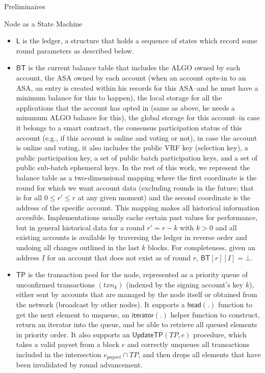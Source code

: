 \documentclass[10pt,a4paper]{article}
\begin{document}
\begin{section}{Preliminaires}
\begin{subsection}{Node as a State Machine}
\begin{itemize}
    \item
    $\mathsf{L}$ is the {\sf ledger}, a structure that holds a sequence of states which
    record some round parameters as described below.
    
    \item
    $\mathsf{BT}$ is the current balance table  that includes 
      the ALGO owned by each account, 
      the ASA owned by each account (when an account opts-in to an ASA, an entry is created within his records for
        this ASA--and he must have a minimum balance for this to happen),
      the local storage for all the applications that the account has opted in (same as above, he needs a minumum
        ALGO balance for this),
      the global storage for this account--in case it belongs to a smart contract,
      the consensus participation status of this account (e.g., if this account is online and voting or not),
      in case the account is online and voting, it also includes
        the public VRF key (selection key),
        a public participation key, 
        a set of public batch participation keys, 
        and a set of public sub-batch ephemeral keys.
        In the rest of this work, we represent the balance table as a two-dimensional mapping where the
        first coordinate is the round for which we want account data (excluding rounds in the future; that
        is for all $0 \leq r\prime \leq r$ at any given moment)
        and the second coordinate is the address of the specific account.
        This mapping makes all historical information accesible. Implementations usually cache certain past
        values for performance, but in general historical data for a round $r\prime = r-k$ with $k>0$ and all 
        existing accounts is available by traversing the ledger in reverse order and undoing all changes outlined 
        in the last $k$ blocks.
        For completeness, given an address $I$ for an account that does not exist as of round $r$,
        $\mathsf{BT}[r][I] = \bot$.

    \item
    $\mathsf{TP}$ is the transaction pool for the node, represented as a priority queue of unconfirmed
    transactions $(txn_k)$ (indexed by the signing account's key $k$), either
    sent by accounts that are managed by the node itself or obtained from the network 
    (broadcast by other nodes).
    It supports 
      a $\mathsf{head(.)}$ function to get the next element to unqueue, 
      an $\mathsf{iterator}(.)$ helper function to construct, return an iterator into the queue, and 
      be able to retrieve all queued elements in priority order.
    It also supports an $\mathsf{UpdateTP}(TP,e)$ procedure, which takes a valid payset from a block $e$
    and correctly unqueues all transactions included in the intersection $e_{payset} \cap TP$, and then
    drops all elements that have been invalidated by round advancement.


\end{itemize}
\end{subsection}
\end{section}
\end{document}
